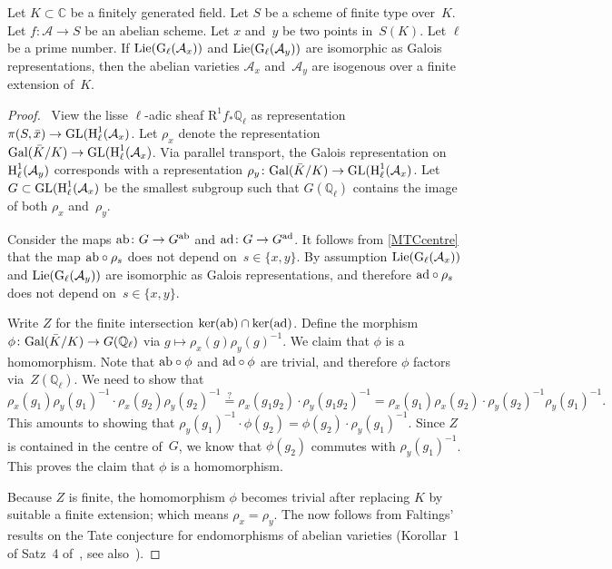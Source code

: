 \documentclass[10pt,twoside,leqno]{article}
\numberwithin{equation}{subsection}
\let\qed\relax
\newcommand{\QQ}{\mathbb{Q}}
\newcommand{\QQl}{\QQ_{\ell}}
\newcommand{\CC}{\mathbb{C}}
\newcommand{\Gal}{\textnormal{Gal}}
\newcommand{\GL}{\textnormal{GL}}
\newcommand{\Lie}{\textnormal{Lie}}
\newcommand{\ab}{\textnormal{ab}}
\newcommand{\ad}{\textnormal{ad}}
\newcommand{\HH}{\textnormal{H}}
\newcommand{\Hl}{\HH_{\ell}}
\newcommand{\GG}{\textnormal{G}}
\newcommand{\Gl}{\GG_{\ell}}
\begin{document}
\begin{proposition} \label{twofib}
 Let \(K \subset \CC\) be a finitely generated field.
 Let \(S\) be a scheme of finite type over~\(K\).
 Let \(f \colon \mathcal{A} \to S\) be an abelian scheme.
 Let \(x\) and~\(y\) be two points in~\(S(K)\).
 Let \(\ell\) be a prime number.
 If \(\Lie(\Gl(\mathcal{A}_{x}))\) and \(\Lie(\Gl(\mathcal{A}_{y}))\)
 are isomorphic as Galois representations,
 then the abelian varieties \(\mathcal{A}_{x}\) and~\(\mathcal{A}_{y}\)
 are isogenous over a finite extension of~\(K\).
\end{proposition}
\begin{proof}
 \pf\ View the lisse \(\ell\)-adic sheaf \(\mathrm{R}^{1}f_{*}\QQl\)
 as representation
 \(\pi(S,\bar{x}) \to \GL(\Hl^{1}(\mathcal{A}_{x})\).
 Let \(\rho_{x}\) denote the representation
 \(\Gal(\bar{K}/K) \to \GL(\Hl^{1}(\mathcal{A}_{x})\).
 Via parallel transport,
 the Galois representation on~\(\Hl^{1}(\mathcal{A}_{y})\)
 corresponds with a representation
 \(\rho_{y} \colon \Gal(\bar{K}/K) \to \GL(\Hl^{1}(\mathcal{A}_{x})\).
 Let \(G \subset \GL(\Hl^{1}(\mathcal{A}_{x})\) be the smallest
 subgroup such that \(G(\QQl)\) contains the image
 of both \(\rho_{x}\) and~\(\rho_{y}\).

 Consider the maps \(\ab \colon G \to G^{\ab}\)
 and \(\ad \colon G \to G^{\ad}\).
 It follows from \cref{MTCcentre} that
 the map \(\ab \circ \rho_{s}\) does not depend on~\(s \in \{x,y\}\).
 By assumption
 \(\Lie(\Gl(\mathcal{A}_{x}))\) and \(\Lie(\Gl(\mathcal{A}_{y}))\)
 are isomorphic as Galois representations,
 and therefore \(\ad \circ \rho_{s}\) does not depend on~\(s \in \{x,y\}\).

 Write \(Z\) for the finite intersection \(\ker(\ab) \cap \ker(\ad)\).
 Define the morphism \(\phi \colon \Gal(\bar{K}/K) \to G(\QQl)\)
 via \(g \mapsto \rho_{x}(g)\rho_{y}(g)^{-1}\).
 We claim that \(\phi\) is a homomorphism.
 Note that \(\ab \circ \phi\) and \(\ad \circ \phi\)
 are trivial, and therefore \(\phi\) factors via~\(Z(\QQl)\).
 We need to show that
 \[
  \rho_{x}(g_{1})\rho_{y}(g_{1})^{-1} \cdot \rho_{x}(g_{2})\rho_{y}(g_{2})^{-1}
  \stackrel{?}{=}
  \rho_{x}(g_{1}g_{2}) \cdot \rho_{y}(g_{1}g_{2})^{-1}
  =
  \rho_{x}(g_{1})\rho_{x}(g_{2}) \cdot
  \rho_{y}(g_{2})^{-1}\rho_{y}(g_{1})^{-1}.
 \]
 This amounts to showing that
 \(\rho_{y}(g_{1})^{-1} \cdot \phi(g_{2}) =
  \phi(g_{2}) \cdot \rho_{y}(g_{1})^{-1}\).
 Since \(Z\) is contained in the centre of~\(G\),
 we know that \(\phi(g_{2})\) commutes with \(\rho_{y}(g_{1})^{-1}\).
 This proves the claim that \(\phi\) is a homomorphism.

 Because \(Z\) is finite,
 the homomorphism \(\phi\) becomes trivial
 after replacing \(K\) by suitable a finite extension;
 which means \(\rho_{x} = \rho_{y}\).
 The  now follows from Faltings' results
 on the Tate conjecture for endomorphisms of abelian varieties
 (Korollar~1 of Satz~4 of~\cite{Fal83}, see also~\cite{Fal84}). \qed
\end{proof}
\end{document}

